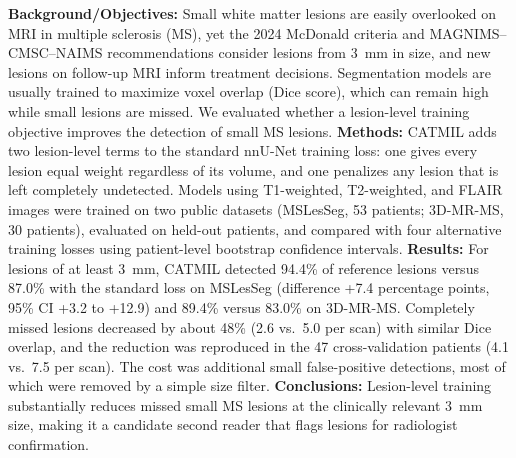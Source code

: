 \textbf{Background/Objectives:} Small white matter lesions are easily overlooked on MRI in multiple sclerosis (MS), yet the 2024 McDonald criteria and MAGNIMS--CMSC--NAIMS recommendations consider lesions from 3~mm in size, and new lesions on follow-up MRI inform treatment decisions. Segmentation models are usually trained to maximize voxel overlap (Dice score), which can remain high while small lesions are missed. We evaluated whether a lesion-level training objective improves the detection of small MS lesions. \textbf{Methods:} CATMIL adds two lesion-level terms to the standard nnU-Net training loss: one gives every lesion equal weight regardless of its volume, and one penalizes any lesion that is left completely undetected. Models using T1-weighted, T2-weighted, and FLAIR images were trained on two public datasets (MSLesSeg, 53 patients; 3D-MR-MS, 30 patients), evaluated on held-out patients, and compared with four alternative training losses using patient-level bootstrap confidence intervals. \textbf{Results:} For lesions of at least 3~mm, CATMIL detected 94.4\% of reference lesions versus 87.0\% with the standard loss on MSLesSeg (difference +7.4 percentage points, 95\% CI +3.2 to +12.9) and 89.4\% versus 83.0\% on 3D-MR-MS. Completely missed lesions decreased by about 48\% (2.6 vs.\ 5.0 per scan) with similar Dice overlap, and the reduction was reproduced in the 47 cross-validation patients (4.1 vs.\ 7.5 per scan). The cost was additional small false-positive detections, most of which were removed by a simple size filter. \textbf{Conclusions:} Lesion-level training substantially reduces missed small MS lesions at the clinically relevant 3~mm size, making it a candidate second reader that flags lesions for radiologist confirmation.
